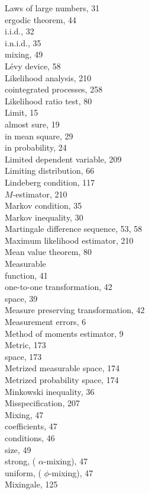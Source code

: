 \documentclass[10pt]{article}
\begin{document}
Laws of large numbers, 31\\
ergodic theorem, 44\\
i.i.d., 32\\
i.n.i.d., 35\\
mixing, 49\\
Lévy device, 58\\
Likelihood analysis, 210\\
cointegrated processes, 258\\
Likelihood ratio test, 80\\
Limit, 15\\
almost sure, 19\\
in mean square, 29\\
in probability, 24\\
Limited dependent variable, 209\\
Limiting distribution, 66\\
Lindeberg condition, 117\\
$M$-estimator, 210\\
Markov condition, 35\\
Markov inequality, 30\\
Martingale difference sequence, 53, 58\\
Maximum likelihood estimator, 210\\
Mean value theorem, 80\\
Measurable\\
function, 41\\
one-to-one transformation, 42\\
space, 39\\
Measure preserving transformation, 42\\
Measurement errors, 6\\
Method of moments estimator, 9\\
Metric, 173\\
space, 173\\
Metrized measurable space, 174\\
Metrized probability space, 174\\
Minkowski inequality, 36\\
Misspecification, 207\\
Mixing, 47\\
coefficients, 47\\
conditions, 46\\
size, 49\\
strong, ( $\alpha$-mixing), 47\\
uniform, ( $\phi$-mixing), 47\\
Mixingale, 125
\end{document}
